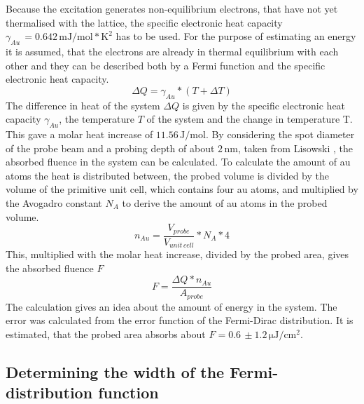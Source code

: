\documentclass[a4paper,12pt,twoside]{article}
\begin{document}
\noindent
 Because the excitation generates non-equilibrium electrons, that have not yet thermalised with the lattice, the specific electronic heat capacity $\gamma_{Au}\,= 0.642\,\mathrm{mJ/mol*K^{2}}$ has to be used. For the purpose of estimating an energy it is assumed, that the electrons are already in thermal equilibrium with each other and they can be described both by a Fermi function and the specific electronic heat capacity.
    \begin{equation}
        \Delta Q = \gamma_{Au} * (T + \Delta T)
    \end{equation}
The difference in heat of the system $\Delta Q$ is given by the specific electronic heat capacity $\gamma_{Au}$, the temperature $T$ of the system and the change in temperature \textDelta T. This gave a molar heat increase of $11.56\,\mathrm{J/mol}$. By considering the spot diameter of the probe beam and a probing depth of about $2\,\mathrm{nm}$, taken from Lisowski \cite{Lisowski2004}, the absorbed fluence in the system can be calculated. To calculate the amount of \gls{au} atoms the heat is distributed between, the probed volume is divided by the volume of the primitive unit cell, which contains four \gls{au} atoms, and multiplied by the Avogadro constant $N_A$ to derive the amount of \gls{au} atoms in the probed volume.
    \begin{equation}
        n_{Au} = \frac{ V_{probe}}{ V_{unit \,cell} } * N_{A} * 4
    \end{equation}
This, multiplied with the molar heat increase, divided by the probed area, gives the absorbed fluence $F$
    \begin{equation}
        F = \frac{ \Delta Q * n_{Au} }{ A_{probe} }
    \end{equation}
The calculation gives an idea about the amount of energy in the system. The error was calculated from the error function of the Fermi-Dirac distribution. It is estimated, that the probed area absorbs about $F = 0.6\,\pm1.2\,\mathrm{\mu J/cm^{2}}$.



       \subsection{Determining the width of the Fermi-distribution function}
            \label{Fermidirac}
            
\end{document}

